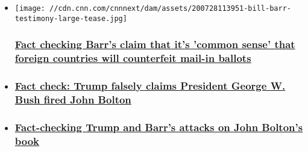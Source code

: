 \begin{itemize}
\item
  \href{/2020/07/29/politics/barr-voter-fraud-fact-check-foreign-countries/index.html}{}

  \texttt{[image: //cdn.cnn.com/cnnnext/dam/assets/200728113951-bill-barr-testimony-large-tease.jpg]}

  \hypertarget{fact-checking-barrs-claim-that-its-common-sense-that-foreign-countries-will-counterfeit-mail-in-ballots}{%
  \subsubsection{\texorpdfstring{\href{/2020/07/29/politics/barr-voter-fraud-fact-check-foreign-countries/index.html}{Fact
  checking Barr's claim that it's 'common sense' that foreign countries
  will counterfeit mail-in
  ballots}}{Fact checking Barr's claim that it's 'common sense' that foreign countries will counterfeit mail-in ballots}}\label{fact-checking-barrs-claim-that-its-common-sense-that-foreign-countries-will-counterfeit-mail-in-ballots}}
\item
  \hypertarget{fact-check-trump-falsely-claims-president-george-w-bush-fired-john-bolton}{%
  \subsubsection{\texorpdfstring{\href{/2020/06/22/politics/fact-check-trump-bush-fired-bolton/index.html}{Fact
  check: Trump falsely claims President George W. Bush fired John
  Bolton}}{Fact check: Trump falsely claims President George W. Bush fired John Bolton}}\label{fact-check-trump-falsely-claims-president-george-w-bush-fired-john-bolton}}
\item
  \hypertarget{fact-checking-trump-and-barrs-attacks-on-john-boltons-book}{%
  \subsubsection{\texorpdfstring{\href{/2020/06/16/politics/fact-check-trump-barr-bolton-book-classified/index.html}{Fact-checking
  Trump and Barr's attacks on John Bolton's
  book}}{Fact-checking Trump and Barr's attacks on John Bolton's book}}\label{fact-checking-trump-and-barrs-attacks-on-john-boltons-book}}
\end{itemize}

